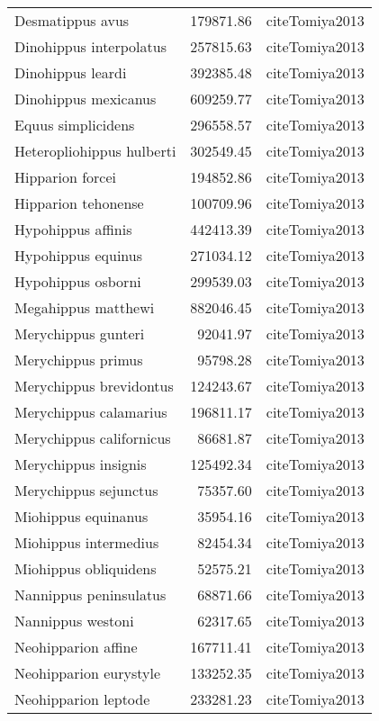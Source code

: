 \begin{table}[ht]
\begin{tabular}{lrl}
  Desmatippus avus & 179871.86 & cite{Tomiya2013} \\ 
  Dinohippus interpolatus & 257815.63 & cite{Tomiya2013} \\ 
  Dinohippus leardi & 392385.48 & cite{Tomiya2013} \\ 
  Dinohippus mexicanus & 609259.77 & cite{Tomiya2013} \\ 
  Equus simplicidens & 296558.57 & cite{Tomiya2013} \\ 
  Heteropliohippus hulberti & 302549.45 & cite{Tomiya2013} \\ 
  Hipparion forcei & 194852.86 & cite{Tomiya2013} \\ 
  Hipparion tehonense & 100709.96 & cite{Tomiya2013} \\ 
  Hypohippus affinis & 442413.39 & cite{Tomiya2013} \\ 
  Hypohippus equinus & 271034.12 & cite{Tomiya2013} \\ 
  Hypohippus osborni & 299539.03 & cite{Tomiya2013} \\ 
  Megahippus matthewi & 882046.45 & cite{Tomiya2013} \\ 
  Merychippus gunteri & 92041.97 & cite{Tomiya2013} \\ 
  Merychippus primus & 95798.28 & cite{Tomiya2013} \\ 
  Merychippus brevidontus & 124243.67 & cite{Tomiya2013} \\ 
  Merychippus calamarius & 196811.17 & cite{Tomiya2013} \\ 
  Merychippus californicus & 86681.87 & cite{Tomiya2013} \\ 
  Merychippus insignis & 125492.34 & cite{Tomiya2013} \\ 
  Merychippus sejunctus & 75357.60 & cite{Tomiya2013} \\ 
  Miohippus equinanus & 35954.16 & cite{Tomiya2013} \\ 
  Miohippus intermedius & 82454.34 & cite{Tomiya2013} \\ 
  Miohippus obliquidens & 52575.21 & cite{Tomiya2013} \\ 
  Nannippus peninsulatus & 68871.66 & cite{Tomiya2013} \\ 
  Nannippus westoni & 62317.65 & cite{Tomiya2013} \\ 
  Neohipparion affine & 167711.41 & cite{Tomiya2013} \\ 
  Neohipparion eurystyle & 133252.35 & cite{Tomiya2013} \\ 
  Neohipparion leptode & 233281.23 & cite{Tomiya2013} \\ 

\end{tabular}
\end{table}
